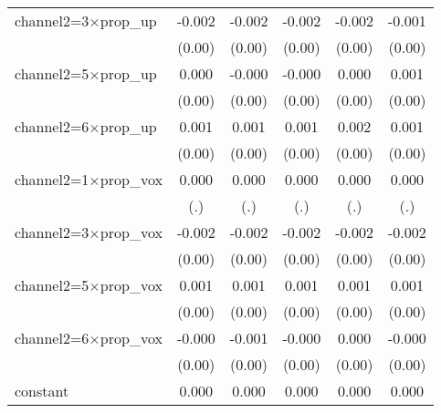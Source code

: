 \begin{table}[htbp]
\begin{tabular}{l*{5}{c}}
channel2=3$\times$prop\_up&      -0.002         &      -0.002         &      -0.002         &      -0.002         &      -0.001         \\
                    &      (0.00)         &      (0.00)         &      (0.00)         &      (0.00)         &      (0.00)         \\
channel2=5$\times$prop\_up&       0.000         &      -0.000         &      -0.000         &       0.000         &       0.001         \\
                    &      (0.00)         &      (0.00)         &      (0.00)         &      (0.00)         &      (0.00)         \\
channel2=6$\times$prop\_up&       0.001         &       0.001         &       0.001         &       0.002         &       0.001         \\
                    &      (0.00)         &      (0.00)         &      (0.00)         &      (0.00)         &      (0.00)         \\
channel2=1$\times$prop\_vox&       0.000         &       0.000         &       0.000         &       0.000         &       0.000         \\
                    &         (.)         &         (.)         &         (.)         &         (.)         &         (.)         \\
channel2=3$\times$prop\_vox&      -0.002         &      -0.002         &      -0.002         &      -0.002         &      -0.002         \\
                    &      (0.00)         &      (0.00)         &      (0.00)         &      (0.00)         &      (0.00)         \\
channel2=5$\times$prop\_vox&       0.001         &       0.001         &       0.001         &       0.001         &       0.001         \\
                    &      (0.00)         &      (0.00)         &      (0.00)         &      (0.00)         &      (0.00)         \\
channel2=6$\times$prop\_vox&      -0.000         &      -0.001         &      -0.000         &       0.000         &      -0.000         \\
                    &      (0.00)         &      (0.00)         &      (0.00)         &      (0.00)         &      (0.00)         \\
constant            &       0.000\sym{***}&       0.000\sym{***}&       0.000\sym{***}&       0.000\sym{***}&       0.000\sym{***}\\

\end{tabular}
\end{table}

